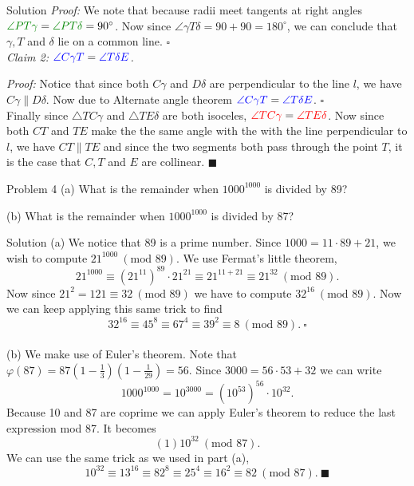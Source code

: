 \documentclass{article}
\begin{document}
\begin{solution}{Solution}
\textit{Proof:} We note that because radii meet tangents at right angles
${\color{darkgreen}{\angle PT \gamma}} =
{\color{darkgreen}{\angle PT \delta}} = 90^\circ$. Now since
$\angle \gamma T \delta = 90 + 90 = 180^\circ$, we can conclude that
$\gamma, T$ and $\delta$ lie on a common line. $\square$ \\

\textit{Claim 2: ${\color{blue}{\angle C\gamma T}} =
{\color{blue}{\angle T\delta E}}$.}\vspace{0.2cm}

\textit{Proof:} Notice that since both $C\gamma$ and $D\delta$ are
perpendicular to the line $l$, we have $C\gamma \parallel D\delta$. Now due
to Alternate angle theorem
${\color{blue}{\angle C\gamma T}} = {\color{blue}{\angle T\delta E}}$.
$\square$
\\

Finally since $\triangle TC\gamma$ and $\triangle TE\delta$ are both
isoceles,
${\color{red}{\angle TC\gamma}} = {\color{red}{\angle TE\delta}}$.
Now since both $CT$ and
$TE$ make the the same angle with the with the line perpendicular to $l$, we
have $CT \parallel TE$ and since the two segments both pass through the
point $T$, it is the case that $C,T$ and $E$ are collinear. $\blacksquare$
\end{solution}
\newpage

\begin{problem}{Problem 4}
(a) What is the remainder when $1000^{1000}$ is divided by 89?
\vspace{0.2cm}

(b) What is the remainder when $1000^{1000}$ is divided by 87?
\end{problem}

\begin{solution}{Solution}
(a) We notice that 89 is a prime number. Since $1000 = 11\cdot 89 + 21$,
we wish to compute $21^{1000} \ (\text{mod } 89)$. We use Fermat's little
theorem,
$$
21^{1000} \equiv (21^{11})^{89}\cdot 21^{21} \equiv 21^{11 + 21}
\equiv 21^{32} \ (\text{mod } 89).
$$
Now since $21^2 = 121 \equiv 32 \ (\text{mod } 89)$ we have to compute
$32^{16} \ (\text{mod } 89)$. Now we can keep applying this same trick
to find
$$
32^{16} \equiv 45^8 \equiv 67^4 \equiv 39^2 \equiv 8 \ (\text{mod } 89). \
\square
$$
\phantom{.}\\
(b) We make use of Euler's theorem. Note that
$\varphi(87) = 87\left(1 - \frac{1}{3}\right)\left(1 - \frac{1}{29}\right)
= 56$. Since $3000 = 56\cdot 53 + 32$ we can write
$$
1000^{1000} = 10^{3000} = (10^{53})^{56} \cdot 10^{32}.
$$
Because 10 and 87 are coprime we can apply Euler's theorem to reduce the
last expression mod 87. It becomes
$$
(1)  10^{32} \ (\text{mod } 87).
$$
We can use the same trick as we used in part (a),
$$
10^{32} \equiv 13^{16} \equiv 82^8 \equiv 25^4 \equiv 16^2 \equiv 82 \
(\text{mod } 87). \ \blacksquare
$$
\end{solution}
\newpage
\end{document}

